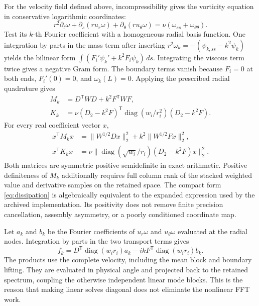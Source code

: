 For the velocity field defined above, incompressibility gives the
vorticity equation in conservative logarithmic coordinates:
\begin{equation}
 r^2\partial_t\omega
  +\partial_s(r u_r\omega)+\partial_\theta(r u_\theta\omega)
   =\nu(\omega_{ss}+\omega_{\theta\theta}).
 \label{eq:vorticity-conservative}
\end{equation}
Test its \(k\)-th Fourier coefficient with a homogeneous radial basis
function. One integration by parts in the mass term after inserting
\(r^2\omega_k=-(\psi_{k,ss}-k^2\psi_k)\) yields the bilinear form
\(\int(F_i'\psi_k'+k^2F_i\psi_k)\,ds\). Integrating the viscous
term twice gives a negative Gram form. The boundary terms vanish
because \(F_i=0\) at both ends, \(F_i'(0)=0\), and
\(\omega_k(L)=0\). Applying the prescribed radial quadrature gives
\begin{align}
 M_k&=D^{\mathsf T}WD+k^2F^{\mathsf T}WF,
       \label{eq:mass}\\
 K_k&=\nu(D_2-k^2F)^{\mathsf T}
        \operatorname{diag}(w_i/r_i^2)(D_2-k^2F).
       \label{eq:dissipation}
\end{align}
For every real coefficient vector \(x\),
\begin{equation}
 \begin{aligned}
 x^{\mathsf T}M_kx&=\|W^{1/2}Dx\|_2^2+k^2\|W^{1/2}Fx\|_2^2,\\
 x^{\mathsf T}K_kx&=\nu\|
    \operatorname{diag}(\sqrt{w_i}/r_i)(D_2-k^2F)x\|_2^2.
 \end{aligned}
 \label{eq:gram-positivity}
\end{equation}
Both matrices are symmetric positive semidefinite in exact
arithmetic. Positive definiteness of \(M_k\) additionally requires
full column rank of the stacked weighted value and derivative samples
on the retained space. The compact form \eqref{eq:dissipation} is
algebraically equivalent to the expanded expression used by the
archived implementation. Its positivity does not remove finite
precision cancellation, assembly asymmetry, or a poorly conditioned
coordinate map.

Let \(a_k\) and \(b_k\) be the Fourier coefficients of
\(u_r\omega\) and \(u_\theta\omega\) evaluated at the radial
nodes. Integration by parts in the two transport terms gives
\begin{equation}
 f_k=D^{\mathsf T}\operatorname{diag}(w_i r_i)a_k
      -ikF^{\mathsf T}\operatorname{diag}(w_i r_i)b_k.
 \label{eq:weak-flux}
\end{equation}
The products use the complete velocity, including the mean block and
boundary lifting. They are evaluated in physical angle and projected
back to the retained spectrum, coupling the otherwise independent
linear mode blocks. This is the reason that making linear solves
diagonal does not eliminate the nonlinear FFT work.

